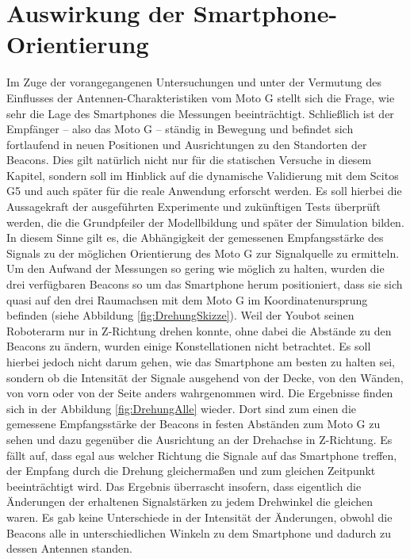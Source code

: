 \section{Auswirkung der Smartphone-Orientierung}
Im Zuge der vorangegangenen Untersuchungen und unter der Vermutung des Einflusses der Antennen-Charakteristiken vom Moto G stellt sich die Frage, wie sehr die Lage des Smartphones die Messungen beeinträchtigt. Schließlich ist der Empfänger -- also das Moto G -- ständig in Bewegung und befindet sich fortlaufend in neuen Positionen und Ausrichtungen zu den Standorten der Beacons. Dies gilt natürlich nicht nur für die statischen Versuche in diesem Kapitel, sondern soll im Hinblick auf die dynamische Validierung mit dem Scitos G5 und auch später für die reale Anwendung erforscht werden. Es soll hierbei die Aussagekraft der ausgeführten Experimente und zukünftigen Tests überprüft werden, die die Grundpfeiler der Modellbildung und später der Simulation bilden. In diesem Sinne gilt es, die Abhängigkeit der gemessenen Empfangsstärke des Signals zu der möglichen Orientierung des Moto G zur Signalquelle zu ermitteln. Um den Aufwand der Messungen so gering wie möglich zu halten, wurden die drei verfügbaren Beacons so um das Smartphone herum positioniert, dass sie sich quasi auf den drei Raumachsen mit dem Moto G im Koordinatenursprung befinden (siehe Abbildung \ref{fig:DrehungSkizze}). Weil der Youbot seinen Roboterarm nur in Z-Richtung drehen konnte, ohne dabei die Abstände zu den Beacons zu ändern, wurden einige Konstellationen nicht betrachtet. Es soll hierbei jedoch nicht darum gehen, wie das Smartphone am besten zu halten sei, sondern ob die Intensität der Signale ausgehend von der Decke, von den Wänden, von vorn oder von der Seite anders wahrgenommen wird. Die Ergebnisse finden sich in der Abbildung \ref{fig:DrehungAlle} wieder. Dort sind zum einen die gemessene Empfangsstärke der Beacons in festen Abständen zum Moto G zu sehen und dazu gegenüber die Ausrichtung an der Drehachse in Z-Richtung. Es fällt auf, dass egal aus welcher Richtung die Signale auf das Smartphone treffen, der Empfang durch die Drehung gleichermaßen und zum gleichen Zeitpunkt beeinträchtigt wird. Das Ergebnis überrascht insofern, dass eigentlich die Änderungen der erhaltenen Signalstärken zu jedem Drehwinkel die gleichen waren. Es gab keine Unterschiede in der Intensität der Änderungen, obwohl die Beacons alle in unterschiedlichen Winkeln zu dem Smartphone und dadurch zu dessen Antennen standen. 
